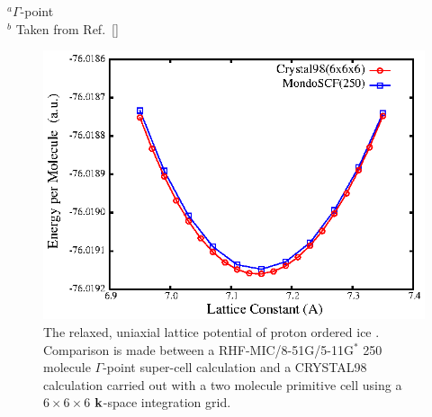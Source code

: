 \documentclass[prb,aps,nobibnotes,twocolumn,doublespace,twocolumngrid,superbib,showpacs]{revtex4}
\begin{document}
\begin{table}[h]
\caption{Lattice constants in \AA~for diamond computed using different system sizes, 
theory levels, and basis sets at a {\tt LOOSE} accuracy. For comparison, 
the experimental value for diamond, extrapolated to $T = 0$K, is 
${\rm a}_0 = 3.567$\AA, while ${\rm a}_0 = 3.583$\AA~is obtained 
with both the RPBE/6-31G* GGA and the RTPSS/6-31G* meta-GGA level of theory \cite{VStaroverov04}.}
\label{DiamondLC}
\raggedright{
{\hskip 0.33in}$^a \Gamma$-point\\
{\hskip 0.33in}$^b$ Taken from Ref.~[]\\}
\end{table}


\begin{figure}
\caption{The relaxed, uniaxial lattice potential of proton ordered ice \cite{SCasassa97}.
Comparison is made between a RHF-MIC/8-51G/5-11G$^*$ 250 molecule $\Gamma$-point super-cell 
calculation and a {\sc CRYSTAL98} calculation carried out with a two molecule primitive
cell using a~$6\times6\times6$ ${\bf k}$-space integration grid.}
\label{IceEnergyVsLattice}
{\center \includegraphics{pIce_En_vs_a.ps}\par}
\end{figure}
\end{document}

